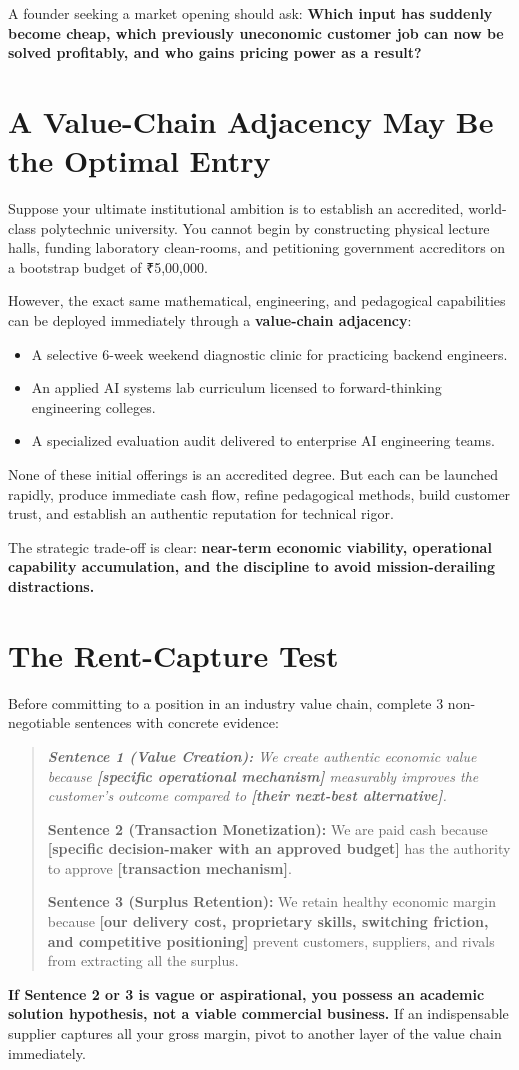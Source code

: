A founder seeking a market opening should ask: \textbf{Which input has suddenly become cheap, which previously uneconomic customer job can now be solved profitably, and who gains pricing power as a result?}

\section{A Value-Chain Adjacency May Be the Optimal Entry}

Suppose your ultimate institutional ambition is to establish an accredited, world-class polytechnic university. You cannot begin by constructing physical lecture halls, funding laboratory clean-rooms, and petitioning government accreditors on a bootstrap budget of ₹5,00,000.

However, the exact same mathematical, engineering, and pedagogical capabilities can be deployed immediately through a \textbf{value-chain adjacency}:
\begin{itemize}[leftmargin=12pt,itemsep=1pt,topsep=1pt]
  \item A selective 6-week weekend diagnostic clinic for practicing backend engineers.
  \item An applied AI systems lab curriculum licensed to forward-thinking engineering colleges.
  \item A specialized evaluation audit delivered to enterprise AI engineering teams.
\end{itemize}

None of these initial offerings is an accredited degree. But each can be launched rapidly, produce immediate cash flow, refine pedagogical methods, build customer trust, and establish an authentic reputation for technical rigor.

The strategic trade-off is clear: \textbf{near-term economic viability, operational capability accumulation, and the discipline to avoid mission-derailing distractions.}

\section{The Rent-Capture Test}

Before committing to a position in an industry value chain, complete 3 non-negotiable sentences with concrete evidence:

\begin{quote}
\itshape
\textbf{Sentence 1 (Value Creation):} We create authentic economic value because \textbf{[specific operational mechanism]} measurably improves the customer's outcome compared to \textbf{[their next-best alternative]}.

\textbf{Sentence 2 (Transaction Monetization):} We are paid cash because \textbf{[specific decision-maker with an approved budget]} has the authority to approve \textbf{[transaction mechanism]}.

\textbf{Sentence 3 (Surplus Retention):} We retain healthy economic margin because \textbf{[our delivery cost, proprietary skills, switching friction, and competitive positioning]} prevent customers, suppliers, and rivals from extracting all the surplus.
\end{quote}

\textbf{If Sentence 2 or 3 is vague or aspirational, you possess an academic solution hypothesis, not a viable commercial business.} If an indispensable supplier captures all your gross margin, pivot to another layer of the value chain immediately.
